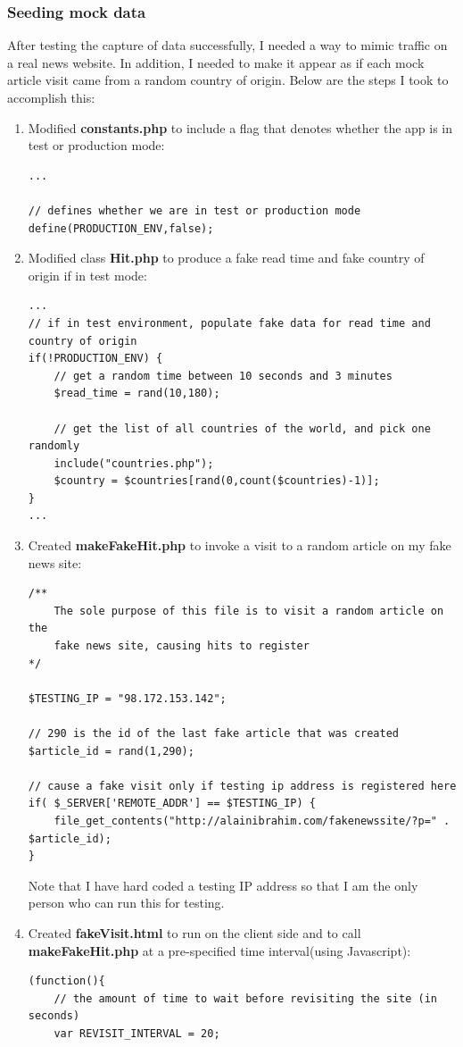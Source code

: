 \documentclass[12pt]{article}
\begin{document}
\subsubsection{Seeding mock data}
After testing the capture of data successfully, I needed a way to mimic traffic on a real news website. In addition, I needed to make it appear as if each mock article visit came from a random country of origin. Below are the steps I took to accomplish this:

\begin{enumerate}
\item{Modified \textbf{constants.php} to include a flag that denotes whether the app is in test or production mode:}
\begin{lstlisting}[basicstyle=\scriptsize]
...

// defines whether we are in test or production mode
define(PRODUCTION_ENV,false);
\end{lstlisting}

\item{Modified class \textbf{Hit.php} to produce a fake read time and fake country of origin if in test mode:}
\begin{lstlisting}[basicstyle=\scriptsize]
...
// if in test environment, populate fake data for read time and country of origin
if(!PRODUCTION_ENV) {
	// get a random time between 10 seconds and 3 minutes
	$read_time = rand(10,180);
	
	// get the list of all countries of the world, and pick one randomly
	include("countries.php");
	$country = $countries[rand(0,count($countries)-1)];
}
...
\end{lstlisting}
\item{Created \textbf{makeFakeHit.php} to invoke a visit to a random article on my fake news site:}
\begin{lstlisting}[basicstyle=\scriptsize]
/**
	The sole purpose of this file is to visit a random article on the 
	fake news site, causing hits to register
*/

$TESTING_IP = "98.172.153.142";

// 290 is the id of the last fake article that was created
$article_id = rand(1,290);

// cause a fake visit only if testing ip address is registered here
if( $_SERVER['REMOTE_ADDR'] == $TESTING_IP) {
	file_get_contents("http://alainibrahim.com/fakenewssite/?p=" . $article_id);
}
\end{lstlisting}
Note that I have hard coded a testing IP address so that I am the only person who can run this for testing.
\item{Created \textbf{fakeVisit.html} to run on the client side and to call \textbf{makeFakeHit.php} at a pre-specified time interval(using Javascript):}
\begin{lstlisting}[basicstyle=\scriptsize]
(function(){
	// the amount of time to wait before revisiting the site (in seconds)
	var REVISIT_INTERVAL = 20;


\end{lstlisting}
\end{enumerate}
\end{document}
